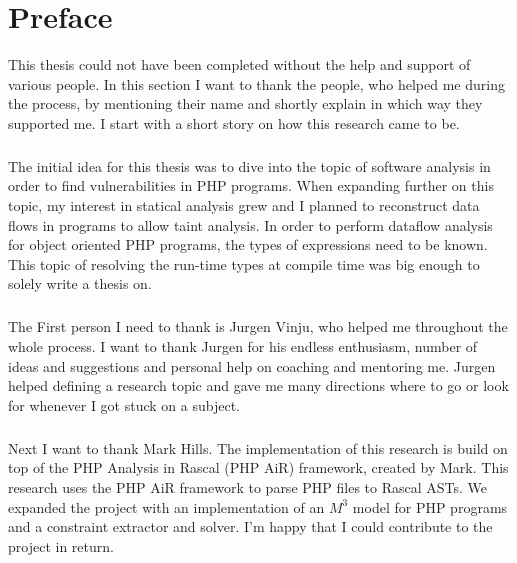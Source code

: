 \documentclass[../main.tex]{subfiles}
\begin{document}
    \chapter*{Preface}\label{ch:preface}
    
    This thesis could not have been completed without the help and support of various people. 
    In this section I want to thank the people, who helped me during the process, by mentioning their name and shortly explain in which way they supported me.
    I start with a short story on how this research came to be.
    
    \paragraph{}
    The initial idea for this thesis was to dive into the topic of software analysis in order to find vulnerabilities in PHP programs.
    When expanding further on this topic, my interest in statical analysis grew and I planned to reconstruct data flows in programs to allow taint analysis.
    In order to perform dataflow analysis for object oriented PHP programs, the types of expressions need to be known.
    This topic of resolving the run-time types at compile time was big enough to solely write a thesis on.
    
    \paragraph{}
    The First person I need to thank is Jurgen Vinju, who helped me throughout the whole process.
    I want to thank Jurgen for his endless enthusiasm, number of ideas and suggestions and personal help on coaching and mentoring me.
    Jurgen helped defining a research topic and gave me many directions where to go or look for whenever I got stuck on a subject.
    
    \paragraph{}
    Next I want to thank Mark Hills.
    The implementation of this research is build on top of the PHP Analysis in Rascal (PHP AiR) framework, created by Mark.
    This research uses the PHP AiR framework to parse PHP files to Rascal ASTs.
    We expanded the project with an implementation of an $M^3$ model for PHP programs and a constraint extractor and solver.
    I'm happy that I could contribute to the project in return.
    
\end{document}
